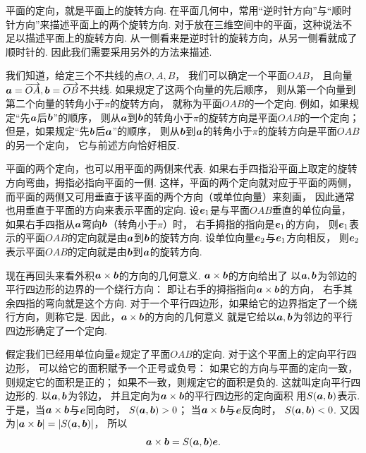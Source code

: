 平面的定向，就是平面上的旋转方向.
在平面几何中，常用“逆时针方向”与“顺时针方向”来描述平面上的两个旋转方向.
对于放在三维空间中的平面，这种说法不足以描述平面上的旋转方向.
从一侧看来是逆时针的旋转方向，从另一侧看就成了顺时针的.
因此我们需要采用另外的方法来描述.

我们知道，给定三个不共线的点\(O,A,B\)，
我们可以确定一个平面\(OAB\)，
且向量\(\boldsymbol{a}=\overrightarrow{OA},
\boldsymbol{b}=\overrightarrow{OB}\)不共线.
如果规定了这两个向量的先后顺序，
则从第一个向量到第二个向量的转角小于\(\pi\)的旋转方向，
就称为平面\(OAB\)的一个定向.
例如，如果规定“先\(\boldsymbol{a}\)后\(\boldsymbol{b}\)”的顺序，
则从\(\boldsymbol{a}\)到\(\boldsymbol{b}\)的转角小于\(\pi\)的旋转方向是平面\(OAB\)的一个定向；
但是，如果规定“先\(\boldsymbol{b}\)后\(\boldsymbol{a}\)”的顺序，
则从\(\boldsymbol{b}\)到\(\boldsymbol{a}\)的转角小于\(\pi\)的旋转方向是平面\(OAB\)的另一个定向，
它与前述方向恰好相反.

平面的两个定向，也可以用平面的两侧来代表.
如果右手四指沿平面上取定的旋转方向弯曲，拇指必指向平面的一侧.
这样，平面的两个定向就对应于平面的两侧，
而平面的两侧又可用垂直于该平面的两个方向（或单位向量）来刻画，
因此通常也用垂直于平面的方向来表示平面的定向.
设\(\boldsymbol{e}_1\)是与平面\(OAB\)垂直的单位向量，
如果右手四指从\(\boldsymbol{a}\)弯向\(\boldsymbol{b}\)（转角小于\(\pi\)）时，
右手拇指的指向是\(\boldsymbol{e}_1\)的方向，
则\(\boldsymbol{e}_1\)表示的平面\(OAB\)的定向就是由\(\boldsymbol{a}\)到\(\boldsymbol{b}\)的旋转方向.
设单位向量\(\boldsymbol{e}_2\)与\(\boldsymbol{e}_1\)方向相反，
则\(\boldsymbol{e}_2\)表示平面\(OAB\)的定向就是由\(\boldsymbol{b}\)到\(\boldsymbol{a}\)的旋转方向.

现在再回头来看外积\(\boldsymbol{a}\times\boldsymbol{b}\)的方向的几何意义.
\(\boldsymbol{a}\times\boldsymbol{b}\)的方向给出了
以\(\boldsymbol{a},\boldsymbol{b}\)为邻边的平行四边形的边界的一个绕行方向：
即让右手的拇指指向\(\boldsymbol{a}\times\boldsymbol{b}\)的方向，
右手其余四指的弯向就是这个方向.
对于一个平行四边形，如果给它的边界指定了一个绕行方向，则称它是.
因此，\(\boldsymbol{a}\times\boldsymbol{b}\)的方向的几何意义
就是它给以\(\boldsymbol{a},\boldsymbol{b}\)为邻边的平行四边形确定了一个定向.

假定我们已经用单位向量\(\boldsymbol{e}\)规定了平面\(OAB\)的定向.
对于这个平面上的定向平行四边形，
可以给它的面积赋予一个正号或负号：
如果它的方向与平面的定向一致，则规定它的面积是正的；
如果不一致，则规定它的面积是负的.
这就叫定向平行四边形的.
以\(\boldsymbol{a},\boldsymbol{b}\)为邻边，
并且定向为\(\boldsymbol{a}\times\boldsymbol{b}\)的平行四边形的定向面积
用\(S(\boldsymbol{a},\boldsymbol{b})\)表示.
于是，当\(\boldsymbol{a}\times\boldsymbol{b}\)与\(\boldsymbol{e}\)同向时，
\(S(\boldsymbol{a},\boldsymbol{b}) > 0\)；
当\(\boldsymbol{a}\times\boldsymbol{b}\)与\(\boldsymbol{e}\)反向时，
\(S(\boldsymbol{a},\boldsymbol{b}) < 0\).
又因为\(
	\abs{\boldsymbol{a}\times\boldsymbol{b}}
	= \abs{S(\boldsymbol{a},\boldsymbol{b})}
\)，
所以\begin{equation}\label{equation:解析几何.向量外积与定向平行四边形的定向面积之间的关系}
	\boldsymbol{a}\times\boldsymbol{b}
	= S(\boldsymbol{a},\boldsymbol{b})
	\boldsymbol{e}.
\end{equation}

